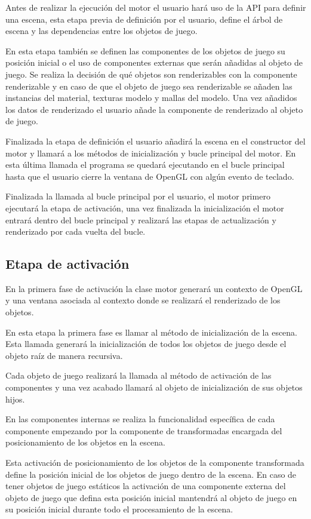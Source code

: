 \documentclass[a4paper, 17pt]{book}
\begin{document}
Antes de realizar la ejecución del motor el usuario hará uso de la API para definir una escena, esta etapa previa de definición por el usuario,
define el árbol de escena y las dependencias entre los objetos de juego. 

En esta etapa también se definen las componentes de los objetos de juego su posición inicial o el uso de componentes externas que serán añadidas
al objeto de juego. Se realiza la decisión de qué objetos son renderizables con la componente renderizable y en caso de que el objeto de juego
sea renderizable se añaden las instancias del material, texturas modelo y mallas del modelo. Una vez añadidos los datos de renderizado el usuario
añade la componente de renderizado al objeto de juego. 

Finalizada la etapa de definición el usuario añadirá la escena en el constructor del motor y llamará a los métodos de inicialización y bucle
principal del motor. En esta última llamada el programa se quedará ejecutando en el bucle principal hasta que el usuario cierre la ventana de
OpenGL con algún evento de teclado.

Finalizada la llamada al bucle principal por el usuario, el motor primero ejecutará la etapa de activación, una vez finalizada la inicialización
el motor entrará dentro del bucle principal y realizará las etapas de actualización y renderizado por cada vuelta del bucle.

\subsection{Etapa de activación}
\label{subsec:activacion}

En la primera fase de activación la clase motor generará un contexto de OpenGL y una ventana asociada al contexto donde se realizará el renderizado
de los objetos.

En esta etapa la primera fase es llamar al método de inicialización de la escena. Esta llamada generará la inicialización de todos los objetos
de juego desde el objeto raíz de manera recursiva.

Cada objeto de juego realizará la llamada al método de activación de las componentes y una vez acabado llamará al objeto de inicialización
de sus objetos hijos.

En las componentes internas se realiza la funcionalidad específica de cada componente empezando por la componente de transformadas
encargada del posicionamiento de los objetos en la escena.

Esta activación de posicionamiento de los objetos de la componente transformada define la posición inicial de los objetos de juego
dentro de la escena. En caso de tener objetos de juego estáticos la activación de una componente externa del objeto de juego que
defina esta posición inicial mantendrá al objeto de juego en su posición inicial durante todo el procesamiento de la escena.
\end{document}
